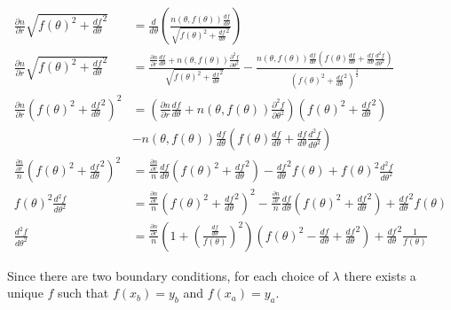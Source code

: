 \documentclass{article}
\begin{document}
\begin{align} 
\frac{\partial n}{\partial r} \sqrt{f(\theta)^2 + \frac{df}{d\theta}^2}
& = \frac{d}{d\theta} \left( 
	\frac{n(\theta, f(\theta)) \frac{df}{d\theta}}
		{\sqrt{f(\theta)^2 + \frac{df}{d\theta}^2}} 
\right) \nonumber \\
\frac{\partial n}{\partial r} \sqrt{f(\theta)^2 + \frac{df}{d\theta}^2}
& = \frac{\frac{\partial n}{\partial r} \frac{df}{d\theta} 
		+ n(\theta, f(\theta)) \frac{\partial^2 f}{\partial \theta^2}}
	{\sqrt{f(\theta)^2 + \frac{df}{d\theta}^2}}
	- \frac{n(\theta, f(\theta)) \frac{df}{d\theta} 
		\left( f(\theta) \frac{df}{d\theta} 
			+ \frac{df}{d\theta} \frac{d^2f}{d\theta^2}
		\right)}
		{\left( f(\theta)^2 + \frac{df}{d\theta}^2 \right)^{\frac32}} \nonumber\\
\frac{\partial n}{\partial r} \left( f(\theta)^2 + \frac{df}{d\theta}^2 \right)^2
& = \left( \frac{\partial n}{\partial r} \frac{df}{d\theta} 
		+ n(\theta, f(\theta)) \frac{\partial^2 f}{\partial \theta^2}\right)
	\left(f(\theta)^2 + \frac{df}{d\theta}^2\right) \nonumber \\
& - n(\theta, f(\theta)) \frac{df}{d\theta} 
		\left( f(\theta) \frac{df}{d\theta} 
			+ \frac{df}{d\theta} \frac{d^2f}{d\theta^2}
		\right) \nonumber\\
\frac{\frac{\partial n}{\partial r}}n 
	\left( f(\theta)^2 + \frac{df}{d\theta}^2 \right)^2
& = \frac{\frac{\partial n}{\partial r}}n \frac{df}{d\theta} 
	\left(f(\theta)^2 + \frac{df}{d\theta}^2\right)
	- \frac{df}{d\theta}^2
		f(\theta) 
	+ f(\theta)^2 \frac{d^2f}{d\theta^2} \nonumber\\
f(\theta)^2 \frac{d^2f}{d\theta^2}
& = \frac{\frac{\partial n}{\partial r}}n 
		\left( f(\theta)^2 + \frac{df}{d\theta}^2 \right)^2
    - \frac{\frac{\partial n}{\partial r}}n \frac{df}{d\theta} 
		\left(f(\theta)^2 + \frac{df}{d\theta}^2\right)
	+ \frac{df}{d\theta}^2
		f(\theta) \nonumber \\
\frac{d^2f}{d\theta^2}
& = \frac{\frac{\partial n}{\partial r}}n 
	\left(1 + \left(\frac{\frac{df}{d\theta}}{f(\theta)}\right)^2\right)
	\left( f(\theta)^2 - \frac{df}{d\theta} + \frac{df}{d\theta}^2 \right)
	+ \frac{df}{d\theta}^2
		\frac{1}{f(\theta)} 
\end{align}

Since there are two boundary conditions, for each choice of $\lambda$ there
	exists a unique $f$ such that $f(x_b) = y_b$ and $f(x_a) = y_a$.
\end{document}
